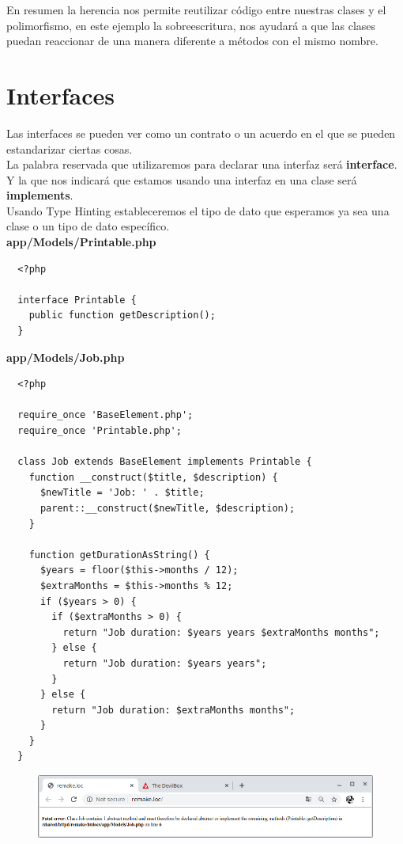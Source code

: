 \documentclass{article}
\begin{document}
En resumen la herencia nos permite reutilizar código entre nuestras clases y el
polimorfismo, en este ejemplo la sobreescritura, nos ayudará a que las clases
puedan reaccionar de una manera diferente a métodos con el mismo nombre.\\



\section{Interfaces}%
Las interfaces se pueden ver como un contrato o un acuerdo en el que se pueden
estandarizar ciertas cosas.\\

La palabra reservada que utilizaremos para declarar una interfaz será
\textbf{interface}. Y la que nos indicará que estamos usando una interfaz en
una clase será \textbf{implements}.\\

Usando Type Hinting estableceremos el tipo de dato que esperamos ya sea una
clase o un tipo de dato específico.\\

\textbf{app/Models/Printable.php}
\begin{verbatim}
  <?php

  interface Printable {
    public function getDescription();
  }
\end{verbatim}

\textbf{app/Models/Job.php}
\begin{verbatim}
  <?php

  require_once 'BaseElement.php';
  require_once 'Printable.php';

  class Job extends BaseElement implements Printable {
    function __construct($title, $description) {
      $newTitle = 'Job: ' . $title;
      parent::__construct($newTitle, $description);
    }

    function getDurationAsString() {
      $years = floor($this->months / 12);
      $extraMonths = $this->months % 12;
      if ($years > 0) {
        if ($extraMonths > 0) {
          return "Job duration: $years years $extraMonths months";
        } else {
          return "Job duration: $years years";
        }
      } else {
        return "Job duration: $extraMonths months";
      }
    }
  }
\end{verbatim}

\begin{figure}[h!]
  \centering
  \includegraphics[scale=0.5]{./Pictures/048_interface_error.png}
\end{figure}
\end{document}

